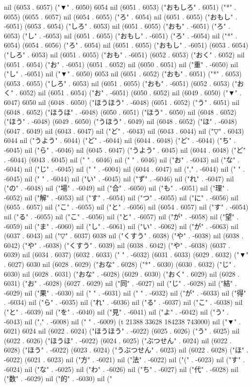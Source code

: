 nil (6053 . 6057) ("▼" . 6050) 6054 nil (6051 . 6053) ("おもしろ" . 6051) ("*" . 6055) (6055 . 6057) nil (6054 . 6055) ("ろ" . 6054) nil (6051 . 6055) ("おもし" . -6051) (6053 . 6054) ("しろ" . 6053) nil (6051 . 6055) ("おも" . -6051) ("ろ" . 6053) ("し" . -6053) nil (6051 . 6055) ("おもし" . -6051) ("ろ" . -6054) nil ("*" . 6054) (6054 . 6056) ("ろ" . 6054) nil (6051 . 6055) ("おもし" . -6051) (6053 . 6054) ("しろ" . 6053) nil (6051 . 6055) ("おも" . -6051) (6052 . 6053) ("おく" . 6052) nil (6051 . 6054) ("お" . -6051) (6051 . 6052) nil (6050 . 6051) nil ("重" . -6050) nil ("し" . -6051) nil ("▼" . 6050) 6053 nil (6051 . 6052) ("おも" . 6051) ("*" . 6053) (6053 . 6055) ("しろ" . 6053) nil (6051 . 6055) ("おも" . -6051) (6052 . 6053) ("おく" . 6052) nil (6051 . 6054) ("お" . -6051) (6050 . 6052) nil (6049 . 6050) ("▼" . 6047) 6050 nil (6048 . 6050) ("ほうほう" . -6048) (6051 . 6052) ("う" . 6051) nil (6048 . 6052) ("ほうほ" . -6048) (6050 . 6051) ("ほう" . 6050) nil (6048 . 6052) ("ほう" . -6048) (6049 . 6050) ("うほう" . 6049) nil (6048 . 6052) ("ほ" . -6048) (6047 . 6049) nil (6043 . 6047) nil ("ど" . -6043) nil (6043 . 6044) nil ("▽" . 6043) 6044 nil ("うよう" . 6044) ("ど" . -6044) nil (6044 . 6048) ("ど" . -6044) ("ち" . -6045) nil ("ら" . -6046) nil (6045 . 6047) ("うよう" . 6045) nil (6044 . 6048) ("ど" . -6044) (6043 . 6045) nil (" " . 6046) nil ("
" . 6046) nil ("お" . -6043) nil ("な" . -6044) nil ("じ" . -6045) nil (" " . -6004) nil (6044 . 6047) nil ("," . -6044) nil (" " . -6045) nil (" " . -6044) nil ("い" . -6045) nil ("ず" . -6046) nil ("れ" . -6047) nil ("の" . -6048) nil ("場" . -6049) nil ("合" . -6050) nil ("も" . -6051) nil ("理" . -6052) nil ("解" . -6053) nil ("す" . -6054) nil ("つ" . -6055) nil ("に" . -6056) nil (6055 . 6057) nil ("こ" . -6055) nil ("と" . -6056) nil (6054 . 6057) nil ("す" . -6054) nil ("る" . -6055) nil ("こ" . -6056) nil ("と" . -6057) nil ("が" . -6058) nil ("望" . -6059) nil ("ま" . -6060) nil ("し" . -6061) nil ("い" . -6062) nil ("が" . -6063) nil (6037 . 6043) nil ("▽" . 6037) 6038 nil ("くすう" . 6038) ("や" . -6038) nil (6038 . 6042) ("や" . -6038) ("くすう" . 6039) nil (6038 . 6042) ("や" . -6038) (6037 . 6039) nil (6034 . 6037) (6032 . 6033) (" " . -6032) (6031 . 6033) (6029 . 6032) ("▼" . 6027) 6030 nil (6028 . 6029) ("おな" . 6028) ("*" . 6030) (6030 . 6032) ("じ" . 6030) nil (6028 . 6031) ("おな" . -6028) (6029 . 6030) ("おく" . 6029) nil (6028 . 6031) ("お" . -6028) (6027 . 6029) nil ("同" . -6027) nil ("じ" . -6028) nil ("結" . -6029) nil ("果" . -6030) nil ("
" . -6031) nil (" " . -6032) nil ("が" . -6033) nil ("得" . -6034) nil ("ら" . -6035) nil ("れ" . -6036) nil ("る" . -6037) nil ("こ" . -6038) nil ("と" . -6039) nil ("を" . -6040) nil ("見" . -6041) nil ("よ" . -6042) nil ("う" . -6043) nil ("," . -6008) nil (" " . -6009) (t 21388 33628 184238 743000) nil ("▼" . 6021) 6024 nil (6022 . 6024) ("ほうほう" . -6022) (6025 . 6026) ("う" . 6025) nil (6022 . 6026) ("ほうほ" . -6022) (6024 . 6025) ("ぶつせん" . 6024) nil (6022 . 6028) ("ほう" . -6022) (6023 . 6024) ("うぶつせん" . 6023) nil (6022 . 6028) ("ほ" . -6022) (6021 . 6023) nil ("方" . -6021) nil ("法" . -6022) nil ("(" . -6023) nil ("す" . -6024) nil ("な" . -6025) nil ("わ" . -6026) nil ("ち" . -6027) nil ("代" . -6028) nil ("数" . -6029) nil ("的" . -6030) nil ("
